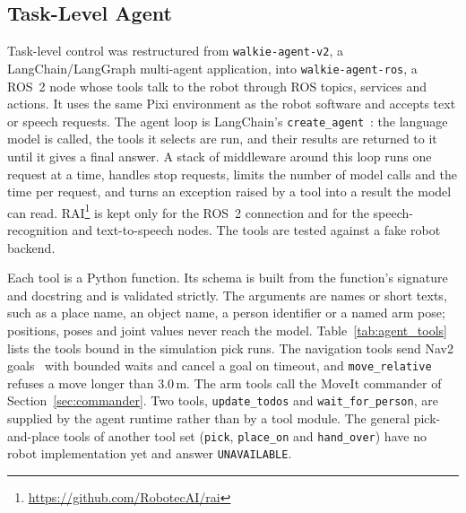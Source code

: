 \documentclass[12pt,a4paper]{article}
\begin{document}
\subsection{Task-Level Agent}
\label{sec:agent}

Task-level control was restructured from \texttt{walkie-agent-v2}, a LangChain/LangGraph multi-agent
application, into \texttt{walkie-agent-ros}, a ROS~2 node whose tools talk to the robot through ROS
topics, services and actions. It uses the same Pixi environment as the robot software and accepts text
or speech requests. The agent loop is LangChain's \texttt{create\_agent}~\cite{langchain}: the language
model is called, the tools it selects are run, and their results are returned to it until it gives a
final answer. A stack of middleware around this loop runs one request at a time, handles stop
requests, limits the number of model calls and the time per request, and turns an exception raised by a
tool into a result the model can read. RAI\footnote{\url{https://github.com/RobotecAI/rai}} is kept only
for the ROS~2 connection and for the speech-recognition and text-to-speech nodes. The tools are tested
against a fake robot backend.

Each tool is a Python function. Its schema is built from the function's signature and docstring and is
validated strictly. The arguments are names or short texts, such as a place name, an object name, a
person identifier or a named arm pose; positions, poses and joint values never reach the model.
Table~\ref{tab:agent_tools} lists the tools bound in the simulation pick runs. The navigation tools send
Nav2 goals~\cite{nav2} with bounded waits and cancel a goal on timeout, and \texttt{move\_relative}
refuses a move longer than 3.0\,m. The arm tools call the MoveIt commander of Section~\ref{sec:commander}.
Two tools, \texttt{update\_todos} and \texttt{wait\_for\_person}, are supplied by the agent runtime
rather than by a tool module. The general pick-and-place tools of another tool set (\texttt{pick},
\texttt{place\_on} and \texttt{hand\_over}) have no robot implementation yet and answer
\texttt{UNAVAILABLE}.
\end{document}
